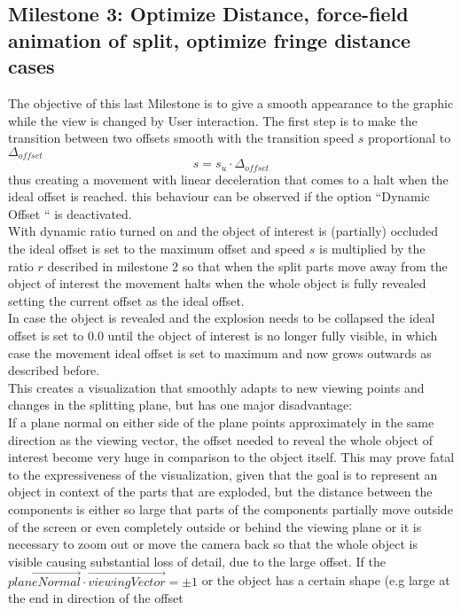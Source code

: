\subsection{Milestone 3: Optimize Distance, force-field animation of split, optimize fringe distance cases} 
The objective of this last Milestone is to give a smooth appearance to the graphic while the view is changed by User interaction. The first step is to make the transition between two offsets smooth with the transition speed $s$ proportional to $\Delta_{offset}$
\begin{equation}
	s=s_u \cdot \Delta_{offset}
\end{equation}
thus creating a movement with linear deceleration that comes to a halt when the ideal offset is reached. this behaviour can be observed if the option ``Dynamic Offset `` is deactivated.\\
With dynamic ratio turned on and the object of interest is (partially) occluded the ideal offset is set to the maximum  offset and speed $s$ is multiplied by the ratio $r$ described in milestone 2 so that when the split parts move away from the object of interest the movement halts when the whole object is fully revealed setting the current offset as the ideal offset.\\
In case the object is revealed and the explosion needs to be collapsed the ideal offset is set to 0.0 until the object of interest is no longer fully visible, in which case the movement ideal offset is set to maximum and now grows outwards as described before.\\
This creates a visualization that smoothly adapts to new viewing points and changes in the splitting plane, but has one major disadvantage:\\
If a plane normal on either side of the plane points approximately in the same direction as the viewing vector,  the offset needed to reveal the whole object of interest become very huge in comparison to the object itself. This may prove fatal to the expressiveness of the visualization, given that the goal is to represent an object in context of the parts that are exploded, but the distance between the components is either so large that parts of the components partially move outside of the screen or even completely outside or behind the viewing plane or it is necessary to zoom out or move the camera back so that the whole object is visible causing substantial loss of detail, due to the large offset. If the $\vec{planeNormal} \cdot \vec{viewingVector} = \pm1$ or the object has a certain shape (e.g large at the end in direction of the offset
